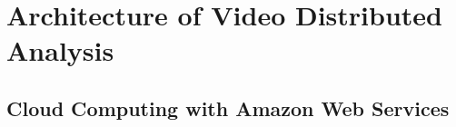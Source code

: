 \chapter{Architecture of Video Distributed Analysis}
\section{\label{section:cloud_computing}Cloud Computing with Amazon Web Services}
